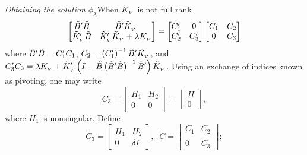 \begin{frame}{\textit{Obtaining the solution}  $\phi_\lambda$}{When $\tilde{K}_{_{V}}$ is not full rank}
\footnotesize
\begin{equation} \label{eq:normal-equation-cholesky}
\begin{bmatrix}
\tilde{B}'\tilde{B} & \tilde{B}'\tilde{K}_{_{ V}} \\
\tilde{K}_{_{ V}}'\tilde{B} & \tilde{K}_{_{ V}}'\tilde{K}_{_{ V}} + \lambda K_{_{ V}}\\
\end{bmatrix}
= \begin{bmatrix}
C'_1 & 0 \\
C'_2  & C'_3 
\end{bmatrix}
\begin{bmatrix}
C_1 & C_2 \\
0  & C_3 
\end{bmatrix}
\end{equation}
\noindent
where $\tilde{B}'\tilde{B} = C'_1 C_1$, $C_2 = \left(C'_1\right)^{-1} \tilde{B}' \tilde{K}_{_{ V}}$, and $C'_3 C_3 = \lambda K_{_{ V}} +  \tilde{K}_{_{ V}}'\left( I - \tilde{B}\left( \tilde{B}' \tilde{B} \right)^{-1} \tilde{B}' \right)\tilde{K}_{_{ V}}$. Using an exchange of indices known as pivoting, one may write 
\begin{equation*}
C_3 = \begin{bmatrix} H_1 & H_2 \\ 0 & 0 \end{bmatrix} = \begin{bmatrix} H \\  0 \end{bmatrix},
\end{equation*}
\noindent
where $H_1$ is nonsingular. Define
\begin{equation} \label{eq:cholesky-factor-mod}
\tilde{C}_3 = \begin{bmatrix}
H_1 & H_2 \\
0  & \delta I 
\end{bmatrix}, \;\;
\tilde{C} = \begin{bmatrix}
C_1 & C_2 \\
0  & \tilde{C}_3 
\end{bmatrix};
\end{equation}
\end{frame}


